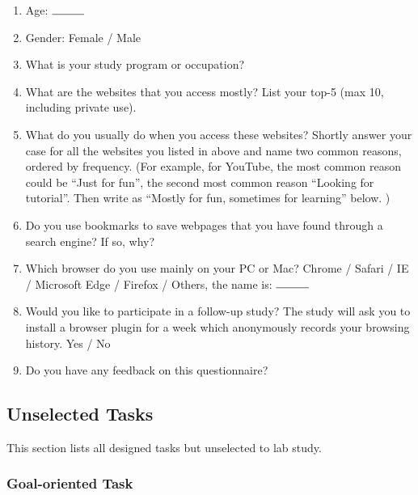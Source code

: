 \begin{enumerate}
    \item Age: $\rule{1cm}{0.15mm}$
    \item Gender: Female / Male
    \item What is your study program or occupation? 
    \item What are the websites that you access mostly? List your top-5 (max 10, including private use).
    \item What do you usually do  when you access these websites? Shortly answer your case for all the websites you listed in above and name  two common reasons, ordered by frequency.
    (For example, for YouTube, the most common reason could be ``Just for fun'', the second most common reason ``Looking for tutorial''. Then write as ``Mostly for fun, sometimes for learning'' below. )
    \item Do you use bookmarks to save webpages that you have found through a search engine? If so, why? 
    \item Which browser do you use mainly on your PC or Mac? 
          Chrome / Safari / IE / Microsoft Edge / Firefox / Others, the name is: $\rule{1cm}{0.15mm}$
    \item Would you like to participate in a follow-up study? The study will ask you to install a browser plugin for a week which anonymously records your browsing history. 
          Yes / No
    \item Do you have any feedback on this questionnaire?
\end{enumerate}

\subsection{Unselected Tasks}
\label{appendix:unselected}

This section lists all designed tasks but unselected to lab study.

\subsubsection{Goal-oriented Task}

